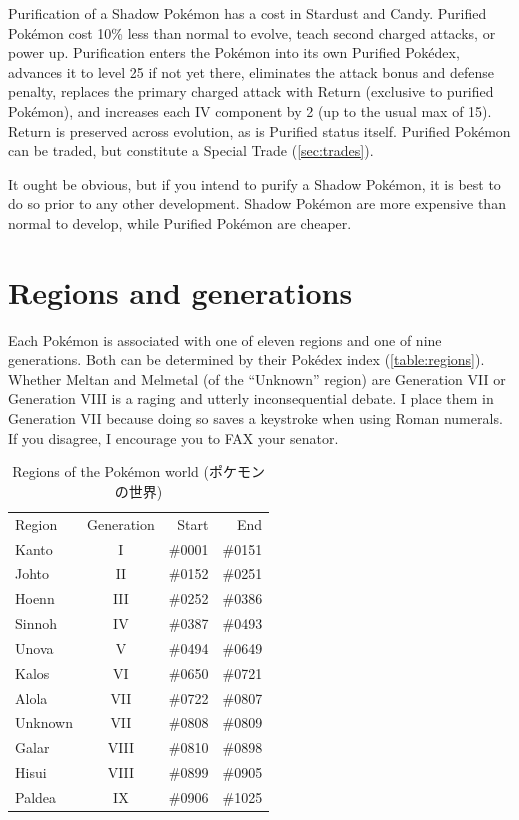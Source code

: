 Purification of a Shadow Pokémon has a cost in Stardust and Candy.
Purified Pokémon cost 10\% less than normal to evolve, teach second charged attacks, or power up.
Purification enters the Pokémon into its own Purified Pokédex,
 advances it to level 25 if not yet there,
 eliminates the attack bonus and defense penalty,
 replaces the primary charged attack with Return (exclusive to purified Pokémon),
 and increases each IV component by 2  (up to the usual max of 15).
Return is preserved across evolution, as is Purified status itself.
Purified Pokémon can be traded, but constitute a Special Trade (\autoref{sec:trades}).

It ought be obvious, but if you intend to purify a Shadow Pokémon, it
  is best to do so prior to any other development.
Shadow Pokémon are more expensive than normal to develop, while Purified Pokémon are cheaper.

\section{Regions and generations}
\label{sec:regions}
Each Pokémon is associated with one of eleven regions and one of nine generations.
Both can be determined by their Pokédex index (\autoref{table:regions}).
Whether Meltan and Melmetal (of the ``Unknown'' region) are Generation VII
  or Generation VIII is a raging and utterly inconsequential debate.
I place them in Generation VII because doing so saves a keystroke when using Roman numerals.
If you disagree, I encourage you to FAX your senator.
\begin{table}
\centering
\begin{tabular}{lcrr}
  Region & Generation & Start & End\\
  \Midrule
  Kanto & I & \#0001 & \#0151\\
  Johto & II & \#0152 & \#0251\\
  Hoenn & III & \#0252 & \#0386\\
  Sinnoh & IV & \#0387 & \#0493\\
  Unova & V & \#0494 & \#0649\\
  Kalos & VI & \#0650 & \#0721\\
  Alola & VII & \#0722 & \#0807\\
  Unknown & VII & \#0808 & \#0809\\
  Galar & VIII & \#0810 & \#0898\\
  Hisui & VIII & \#0899 & \#0905\\
  Paldea & IX & \#0906 & \#1025\\
\end{tabular}
\caption[Regions of the Pokémon world]{Regions of the Pokémon world (\textjapanese{ポケモンの世界})}
\label{table:regions}
\end{table}

